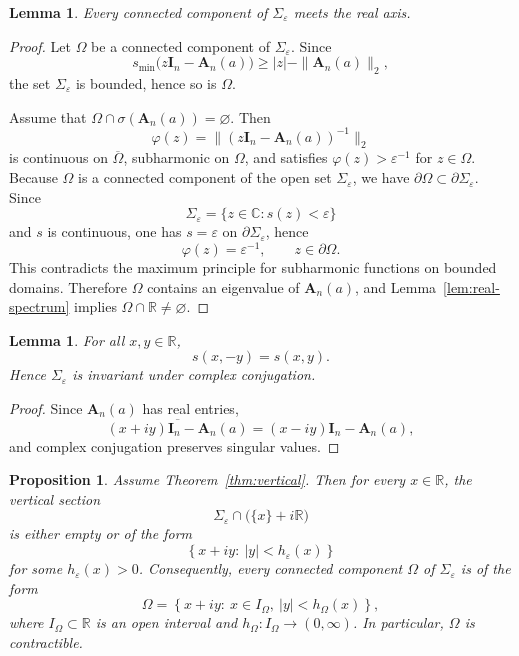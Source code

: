 \documentclass[11pt]{article}
\numberwithin{equation}{section}
\newtheorem{proposition}[theorem]{Proposition}
\newtheorem{lemma}[theorem]{Lemma}
\begin{document}
\begin{lemma}\label{lem:real-axis}
Every connected component of $\Sigma_\varepsilon$ meets the real axis.
\end{lemma}

\begin{proof}
Let $\Omega$ be a connected component of $\Sigma_\varepsilon$.  Since
\[
s_{\min}\!\bigl(z\mathbf I_n-\mathbf A_n(a)\bigr)\ge |z|-\|\mathbf A_n(a)\|_2,
\]
the set $\Sigma_\varepsilon$ is bounded, hence so is $\Omega$.

Assume that $\Omega\cap\sigma(\mathbf A_n(a))=\varnothing$.  Then
\[
\varphi(z)=\bigl\|(z\mathbf I_n-\mathbf A_n(a))^{-1}\bigr\|_2
\]
is continuous on $\overline\Omega$, subharmonic on $\Omega$, and satisfies
$\varphi(z)>\varepsilon^{-1}$ for $z\in\Omega$.
Because $\Omega$ is a connected component of the open set $\Sigma_\varepsilon$,
we have $\partial\Omega\subset\partial\Sigma_\varepsilon$.  Since
\[
\Sigma_\varepsilon=\{z\in\mathbb{C}:s(z)<\varepsilon\}
\]
and $s$ is continuous, one has $s=\varepsilon$ on $\partial\Sigma_\varepsilon$, hence
\[
\varphi(z)=\varepsilon^{-1},\qquad z\in\partial\Omega.
\]
This contradicts the maximum principle for subharmonic functions on bounded
domains.  Therefore $\Omega$ contains an eigenvalue of $\mathbf A_n(a)$, and
Lemma~\ref{lem:real-spectrum} implies $\Omega\cap\mathbb{R}\neq\varnothing$.
\end{proof}

\begin{lemma}\label{lem:conj}
For all $x,y\in\mathbb{R}$,
\[
s(x,-y)=s(x,y).
\]
Hence $\Sigma_\varepsilon$ is invariant under complex conjugation.
\end{lemma}

\begin{proof}
Since $\mathbf A_n(a)$ has real entries,
\[
\overline{(x+iy)\mathbf I_n-\mathbf A_n(a)}
=
(x-iy)\mathbf I_n-\mathbf A_n(a),
\]
and complex conjugation preserves singular values.
\end{proof}

\begin{proposition}\label{prop:topological-reduction}
Assume Theorem~\ref{thm:vertical}.  Then for every $x\in\mathbb{R}$, the vertical
section
\[
\Sigma_\varepsilon\cap\bigl(\{x\}+i\mathbb{R}\bigr)
\]
is either empty or of the form
\[
\left\{x+iy:\ |y|<h_\varepsilon(x)\right\}
\]
for some $h_\varepsilon(x)>0$.  Consequently, every connected component $\Omega$
of $\Sigma_\varepsilon$ is of the form
\[
\Omega
=
\left\{
x+iy:\ x\in I_\Omega,\ |y|<h_\Omega(x)
\right\},
\]
where $I_\Omega\subset\mathbb{R}$ is an open interval and $h_\Omega:I_\Omega\to(0,\infty)$.
In particular, $\Omega$ is contractible.
\end{proposition}
\end{document}
